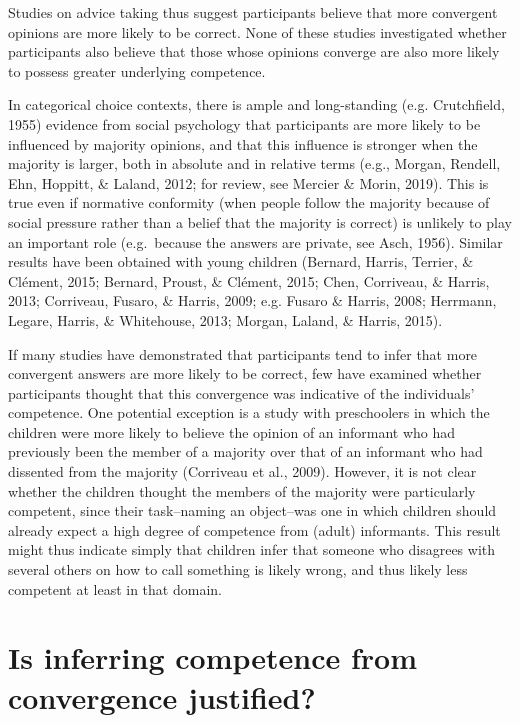 \documentclass[
  doc,floatsintext]{apa6}
\begin{document}
Studies on advice taking thus suggest participants believe that more convergent opinions are more likely to be correct. None of these studies investigated whether participants also believe that those whose opinions converge are also more likely to possess greater underlying competence.

In categorical choice contexts, there is ample and long-standing (e.g. Crutchfield, 1955) evidence from social psychology that participants are more likely to be influenced by majority opinions, and that this influence is stronger when the majority is larger, both in absolute and in relative terms (e.g., Morgan, Rendell, Ehn, Hoppitt, \& Laland, 2012; for review, see Mercier \& Morin, 2019). This is true even if normative conformity (when people follow the majority because of social pressure rather than a belief that the majority is correct) is unlikely to play an important role (e.g.~because the answers are private, see Asch, 1956). Similar results have been obtained with young children (Bernard, Harris, Terrier, \& Clément, 2015; Bernard, Proust, \& Clément, 2015; Chen, Corriveau, \& Harris, 2013; Corriveau, Fusaro, \& Harris, 2009; e.g. Fusaro \& Harris, 2008; Herrmann, Legare, Harris, \& Whitehouse, 2013; Morgan, Laland, \& Harris, 2015).

If many studies have demonstrated that participants tend to infer that more convergent answers are more likely to be correct, few have examined whether participants thought that this convergence was indicative of the individuals' competence. One potential exception is a study with preschoolers in which the children were more likely to believe the opinion of an informant who had previously been the member of a majority over that of an informant who had dissented from the majority (Corriveau et al., 2009). However, it is not clear whether the children thought the members of the majority were particularly competent, since their task--naming an object--was one in which children should already expect a high degree of competence from (adult) informants. This result might thus indicate simply that children infer that someone who disagrees with several others on how to call something is likely wrong, and thus likely less competent at least in that domain.

\section{Is inferring competence from convergence justified?}\label{is-inferring-competence-from-convergence-justified}
\end{document}
